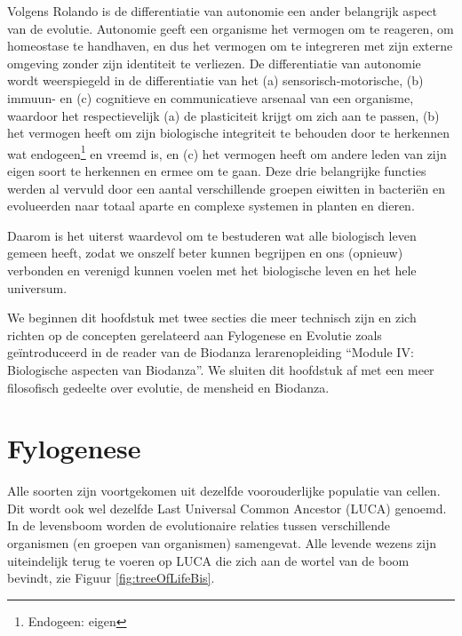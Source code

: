 \documentclass[
  11pt,
]{book}
\begin{document}
Volgens Rolando is de differentiatie van autonomie een ander belangrijk aspect van de evolutie. Autonomie geeft een organisme het vermogen om te reageren, om homeostase te handhaven, en dus het vermogen om te integreren met zijn externe omgeving zonder zijn identiteit te verliezen. De differentiatie van autonomie wordt weerspiegeld in de differentiatie van het (a) sensorisch-motorische, (b) immuun- en (c) cognitieve en communicatieve arsenaal van een organisme, waardoor het respectievelijk (a) de plasticiteit krijgt om zich aan te passen, (b) het vermogen heeft om zijn biologische integriteit te behouden door te herkennen wat endogeen\footnote{Endogeen: eigen} en vreemd is, en (c) het vermogen heeft om andere leden van zijn eigen soort te herkennen en ermee om te gaan. Deze drie belangrijke functies werden al vervuld door een aantal verschillende groepen eiwitten in bacteriën en evolueerden naar totaal aparte en complexe systemen in planten en dieren.

Daarom is het uiterst waardevol om te bestuderen wat alle biologisch leven gemeen heeft, zodat we onszelf beter kunnen begrijpen en ons (opnieuw) verbonden en verenigd kunnen voelen met het biologische leven en het hele universum.

We beginnen dit hoofdstuk met twee secties die meer technisch zijn en zich richten op de concepten gerelateerd aan Fylogenese en Evolutie zoals geïntroduceerd in de reader van de Biodanza lerarenopleiding ``Module IV: Biologische aspecten van Biodanza''. We sluiten dit hoofdstuk af met een meer filosofisch gedeelte over evolutie, de mensheid en Biodanza.

\hypertarget{fylogenese}{%
\section{Fylogenese}\label{fylogenese}}

Alle soorten zijn voortgekomen uit dezelfde voorouderlijke populatie van cellen. Dit wordt ook wel dezelfde Last Universal Common Ancestor (LUCA) genoemd. In de levensboom worden de evolutionaire relaties tussen verschillende organismen (en groepen van organismen) samengevat. Alle levende wezens zijn uiteindelijk terug te voeren op LUCA die zich aan de wortel van de boom bevindt, zie Figuur \ref{fig:treeOfLifeBis}.
\end{document}
